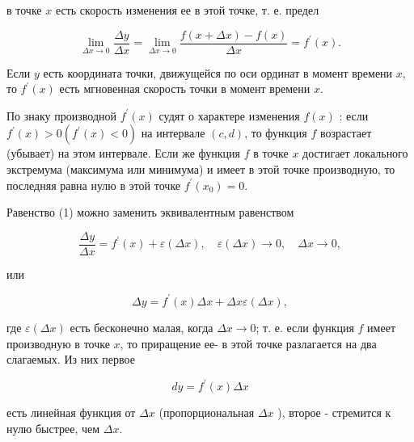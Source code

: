 \documentclass[10pt]{article}
\begin{document}
в точке $x$ есть скорость изменения ее в этой точке, т. е. предел



\[

\lim _{\Delta x \rightarrow 0} \frac{\Delta y}{\Delta x}=\lim _{\Delta x \rightarrow 0} \frac{f(x+\Delta x)-f(x)}{\Delta x}=f^{\prime}(x) .

\]



Если $y$ есть координата точки, движущейся по оси ординат в момент времени $x$, то $f^{\prime}(x)$ есть мгновенная скорость точки в момент времени $x$.



По знаку производной $f^{\prime}(x)$ судят о характере изменения $f(x)$ : если $f^{\prime}(x)>0\left(f^{\prime}(x)<0\right)$ на интервале $(c, d)$, то функция $f$ возрастает (убывает) на этом интервале. Если же функция $f$ в точке $x$ достигает локального экстремума (максимума или минимума) и имеет в этой точке производную, то последняя равна нулю в этой точке $f^{\prime}\left(x_{0}\right)=0$.



Равенство (1) можно заменить эквивалентным равенством



\[

\frac{\Delta y}{\Delta x}=f^{\prime}(x)+\varepsilon(\Delta x), \quad \varepsilon(\Delta x) \rightarrow 0, \quad \Delta x \rightarrow 0,

\]



или



\[

\Delta y=f^{\prime}(x) \Delta x+\Delta x \varepsilon(\Delta x),

\]



где $\varepsilon(\Delta x)$ есть бесконечно малая, когда $\Delta x \rightarrow 0$; т. е. если функция $f$ имеет производную в точке $x$, то приращение ее- в этой точке разлагается на два слагаемых. Из них первое



\[

d y=f^{\prime}(x) \Delta x

\]



есть линейная функция от $\Delta x$ (пропорциональная $\Delta x$ ), второе - стремится к нулю быстрее, чем $\Delta x$.
\end{document}
